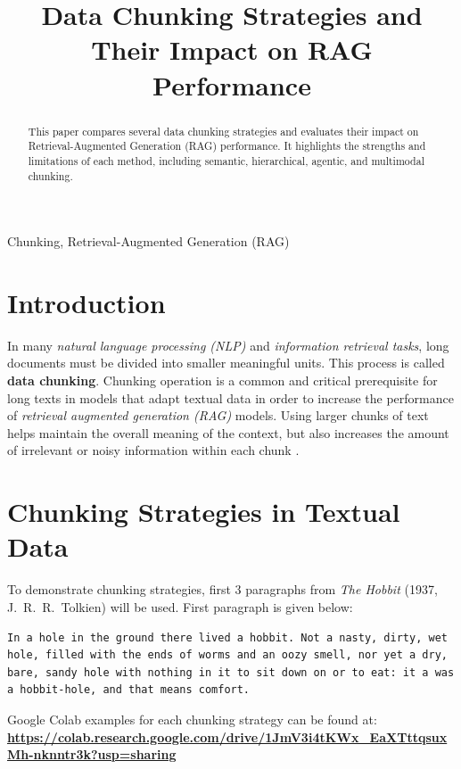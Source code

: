 \documentclass[conference]{IEEEtran}
\begin{document}
\title{Data Chunking Strategies and Their Impact on RAG Performance}

\author{
}

\maketitle

\begin{abstract}
This paper compares several data chunking strategies and evaluates their impact on Retrieval-Augmented Generation (RAG) performance. It highlights the strengths and limitations of each method, including semantic, hierarchical, agentic, and multimodal chunking.
\end{abstract}

\begin{IEEEkeywords}
Chunking, Retrieval-Augmented Generation (RAG)
\end{IEEEkeywords}

\section{Introduction}
In many \textit{natural language processing (NLP)} and \textit{information retrieval tasks}, long documents must be divided into smaller meaningful units. This process is called \textbf{data chunking}. Chunking operation is a common and critical prerequisite for long texts in models that adapt textual data in order to increase the performance of \textit{retrieval augmented generation (RAG)} models. Using larger chunks of text helps maintain the overall meaning of the context, but also increases the amount of irrelevant or noisy information within each chunk \cite{liu2024lost}.

\section{Chunking Strategies in Textual Data}
To demonstrate chunking strategies, first 3 paragraphs from \textit{The Hobbit} (1937, J.~R.~R.~Tolkien) will be used. First paragraph is given below:
\footnotesize
\begin{tcolorbox}[colback=gray!15, colframe=gray!75, arc=8mm]
\begin{lstlisting}[breaklines=true, columns=fullflexible]
In a hole in the ground there lived a hobbit. Not a nasty, dirty, wet hole, filled with the ends of worms and an oozy smell, nor yet a dry, bare, sandy hole with nothing in it to sit down on or to eat: it a was a hobbit-hole, and that means comfort.
\end{lstlisting}
\end{tcolorbox}
Google Colab examples for each chunking strategy can be found at:
\textbf{\noindent\url{https://colab.research.google.com/drive/1JmV3i4tKWx_EaXTttqsuxMh-nknntr3k?usp=sharing}}
\normalsize
\end{document}

